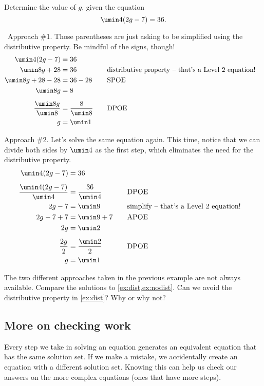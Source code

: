 \begin{boxedex}
\label{ex:nodist}
Determine the value of $g$, given the equation \[\umin4(2g - 7) = 36.\]

\exsoln\ Approach \#1. Those parentheses are just asking to be simplified using the distributive property. Be mindful of the signs, though!
\[\begin{aligned}
\umin4(2g - 7) &= 36\\
\umin8g + 28 &= 36
&&\text{\quad distributive property -- that's a Level 2 equation!}\\
\umin8g + 28 - 28 &= 36 - 28
&&\text{\quad SPOE}\\
\umin8g &= 8\\[1ex]
\frac{\umin8g}{\umin8} &= \frac{8}{\umin8}
&&\text{\quad DPOE}\\
g &= \umin1
\end{aligned}\]

Approach \#2. Let's solve the same equation again. This time, notice that we can divide both sides by $\umin4$ as the first step, which eliminates the need for the distributive property.
\[\begin{aligned}
\umin4(2g - 7) &= 36\\[1ex]
\frac{\umin4(2g-7)}{\umin4} &= \frac{36}{\umin4}
&&\text{\quad DPOE}\\
2g-7 &= \umin9
&&\text{\quad simplify -- that's a Level 2 equation!}\\
2g-7+7 &= \umin9+7
&&\text{\quad APOE}\\
2g &= \umin2
&&\text{\quad}\\[1ex]
\frac{2g}{2} &= \frac{\umin2}{2}
&&\text{\quad DPOE}\\
g &= \umin1
\end{aligned}\]

\end{boxedex}

The two different approaches taken in the previous example are not always available. Compare the solutions to \cref{ex:dist,ex:nodist}. Can we avoid the distributive property in \cref{ex:dist}? Why or why not?


\subsection{More on checking work}

Every step we take in solving an equation generates an equivalent equation that has the same solution set. If we make a mistake, we accidentally create an equation with a different solution set. Knowing this can help us check our answers on the more complex equations (ones that have more steps).

